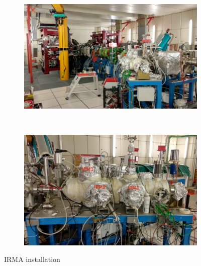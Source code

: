 \begin{figure}[!ht]
	\begin{subfigure}{0.5\textwidth}
		\includegraphics[width=\textwidth]{04_IPHI_Test/figures/fig000_IPHI_tb1.jpg}
		\caption{}
		\label{}
	\end{subfigure}
	~
	\begin{subfigure}{0.5\textwidth}
		\includegraphics[width=\textwidth]{04_IPHI_Test/figures/fig000_IPHI_tb2.jpg}
		\caption{}
		\label{}
	\end{subfigure}
	\caption[IRMA installation]{IRMA installation}
	\label{chap4:IRMA_setup}
\end{figure}
